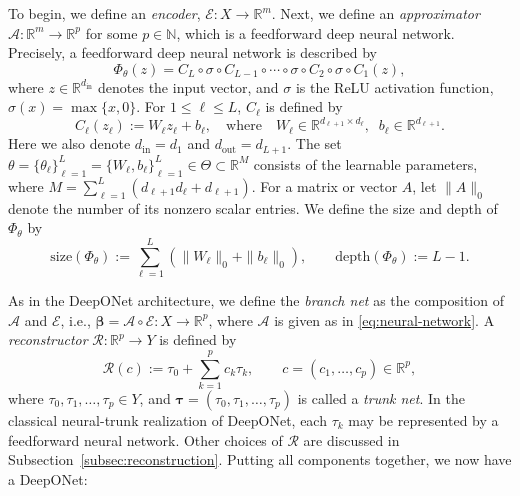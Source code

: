 \documentclass{article}
\numberwithin{equation}{section}
\theoremstyle{plain}
\begin{document}
	To begin, we define an \textit{encoder}, $\mathcal{E}:X\to\mathbb{R}^{m}$. Next, we define an \textit{approximator} $\mathcal{A}:\mathbb{R}^{m}\to\mathbb{R}^{p}$ for some $p\in\mathbb{N}$, which is a feedforward deep neural network. Precisely, a feedforward deep neural network is described by
	\begin{equation}\label{eq:neural-network}
		\Phi_{\theta}(z)=C_{L}\circ\sigma\circ C_{L-1}\circ\cdots\circ\sigma\circ C_{2}\circ\sigma\circ C_{1}(z),
	\end{equation}
	where $z\in\mathbb{R}^{d_{\mathrm{in}}}$ denotes the input vector, and $\sigma$ is the ReLU activation function, $\sigma(x)=\max\{x,0\}$. For $1\leq\ell\leq L$, $C_{\ell}$ is defined by
	\begin{equation*}
		C_\ell(z_\ell):=W_\ell z_\ell+b_\ell,\quad\text{where}\quad W_{\ell}\in\mathbb{R}^{d_{\ell+1}\times d_{\ell}},\;\;b_{\ell}\in\mathbb{R}^{d_{\ell+1}}.
	\end{equation*}
	Here we also denote $d_{\mathrm{in}}=d_{1}$ and $d_{\mathrm{out}}=d_{L+1}$. The set $\theta=\{\theta_{\ell}\}_{\ell=1}^{L}=\{W_{\ell},b_{\ell}\}_{\ell=1}^{L}\in \Theta\subset\mathbb{R}^{M}$ consists of the learnable parameters, where $M=\sum_{\ell=1}^{L}(d_{\ell+1}d_{\ell}+d_{\ell+1})$. For a matrix or vector $A$, let $\|A\|_0$ denote the number of its
	nonzero scalar entries. We define the size and depth of
	$\Phi_{\theta}$ by
	\begin{equation*}
		\mathrm{size}(\Phi_{\theta})
		:=
		\sum_{\ell=1}^{L}
		\left(
		\|W_{\ell}\|_0+\|b_{\ell}\|_0
		\right),
		\qquad
		\mathrm{depth}(\Phi_{\theta})
		:=
		L-1.
	\end{equation*}
	
	As in the DeepONet architecture, we define the \textit{branch net} as the composition of $\mathcal{A}$ and $\mathcal{E}$, i.e., $\boldsymbol{\beta}=\mathcal{A}\circ\mathcal{E}:X\to\mathbb{R}^{p}$, where $\mathcal{A}$ is given as in \eqref{eq:neural-network}. A \textit{reconstructor} $\mathcal{R}:\mathbb{R}^{p}\to Y$ is defined by
	\begin{equation*}
		\mathcal R(c):=\tau_0+\sum_{k=1}^p c_k\tau_k,
		\qquad c=(c_1,\ldots,c_p)\in\mathbb R^p,
	\end{equation*}
	where $\tau_0,\tau_1,\ldots,\tau_p\in Y$, and $\boldsymbol{\tau}=(\tau_{0},\tau_{1},\ldots,\tau_{p})$ is called a \textit{trunk net}. In the classical neural-trunk realization of DeepONet, each $\tau_k$ may be represented by a feedforward neural network. Other choices of $\mathcal R$ are discussed in Subsection~\ref{subsec:reconstruction}. Putting all components together, we now have a DeepONet:
	
\end{document}

